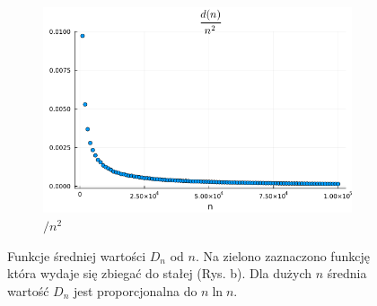 \documentclass{article}
\begin{document}
\begin{figure}[h]
    \begin{subfigure}{0.32\textwidth}
        \centering
        \includegraphics[width=1.0\textwidth]{../results/d(n)_3.png}
        \caption{$/ n^2$}
    \end{subfigure}
    \caption{Funkcje średniej wartości $D_n$ od $n$. Na zielono zaznaczono funkcję która wydaje się zbiegać do stałej (Rys. b). Dla dużych $n$ średnia wartość $D_n$ jest proporcjonalna do $n\ln n$.}
\end{figure}
\end{document}
